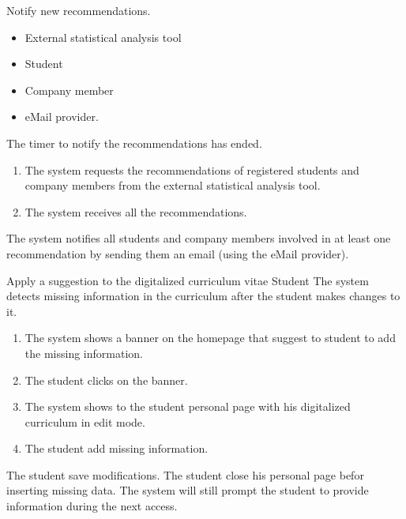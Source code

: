 \usecase
{Notify new recommendations.}
{
    \begin{itemize}
        \item External statistical analysis tool
        \item Student
        \item Company member
        \item eMail provider.
    \end{itemize}
}
{
    The timer to notify the recommendations has ended.
}
{
    \begin{enumerate}
        \item The system requests the recommendations of registered students and company members from the external statistical analysis tool.
        \item The system receives all the recommendations.
    \end{enumerate}
}
{
    The system notifies all students and company members involved in at least one recommendation by sending them an email (using the eMail provider).
}
{

}
{

}

\usecase
{Apply a suggestion to the digitalized curriculum vitae}
{
    Student
}
{
    The system detects missing information in the curriculum after the student makes changes to it.
}
{
    \begin{enumerate}
        \item The system shows a banner on the homepage that suggest to student to add the missing information.
        \item The student clicks on the banner.
        \item The system shows to the student personal page with his digitalized curriculum in edit mode.
        \item The student add missing information.
    \end{enumerate}
}
{
    The student save modifications.
}
{
    The student close his personal page befor inserting missing data. The system will still prompt the student to provide information during the next access.
}
{

}

